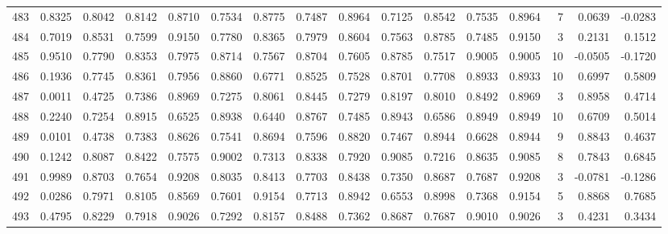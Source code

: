 \begin{tabular}{lrrrrrrrrrrrrrrr}
483 &      0.8325 &  0.8042 &  0.8142 &  0.8710 &  0.7534 &  0.8775 &  0.7487 &  0.8964 &  0.7125 &  0.8542 &   0.7535 &     0.8964 &      7 &                    0.0639 &                    -0.0283 \\
484 &      0.7019 &  0.8531 &  0.7599 &  0.9150 &  0.7780 &  0.8365 &  0.7979 &  0.8604 &  0.7563 &  0.8785 &   0.7485 &     0.9150 &      3 &                    0.2131 &                     0.1512 \\
485 &      0.9510 &  0.7790 &  0.8353 &  0.7975 &  0.8714 &  0.7567 &  0.8704 &  0.7605 &  0.8785 &  0.7517 &   0.9005 &     0.9005 &     10 &                   -0.0505 &                    -0.1720 \\
486 &      0.1936 &  0.7745 &  0.8361 &  0.7956 &  0.8860 &  0.6771 &  0.8525 &  0.7528 &  0.8701 &  0.7708 &   0.8933 &     0.8933 &     10 &                    0.6997 &                     0.5809 \\
487 &      0.0011 &  0.4725 &  0.7386 &  0.8969 &  0.7275 &  0.8061 &  0.8445 &  0.7279 &  0.8197 &  0.8010 &   0.8492 &     0.8969 &      3 &                    0.8958 &                     0.4714 \\
488 &      0.2240 &  0.7254 &  0.8915 &  0.6525 &  0.8938 &  0.6440 &  0.8767 &  0.7485 &  0.8943 &  0.6586 &   0.8949 &     0.8949 &     10 &                    0.6709 &                     0.5014 \\
489 &      0.0101 &  0.4738 &  0.7383 &  0.8626 &  0.7541 &  0.8694 &  0.7596 &  0.8820 &  0.7467 &  0.8944 &   0.6628 &     0.8944 &      9 &                    0.8843 &                     0.4637 \\
490 &      0.1242 &  0.8087 &  0.8422 &  0.7575 &  0.9002 &  0.7313 &  0.8338 &  0.7920 &  0.9085 &  0.7216 &   0.8635 &     0.9085 &      8 &                    0.7843 &                     0.6845 \\
491 &      0.9989 &  0.8703 &  0.7654 &  0.9208 &  0.8035 &  0.8413 &  0.7703 &  0.8438 &  0.7350 &  0.8687 &   0.7687 &     0.9208 &      3 &                   -0.0781 &                    -0.1286 \\
492 &      0.0286 &  0.7971 &  0.8105 &  0.8569 &  0.7601 &  0.9154 &  0.7713 &  0.8942 &  0.6553 &  0.8998 &   0.7368 &     0.9154 &      5 &                    0.8868 &                     0.7685 \\
493 &      0.4795 &  0.8229 &  0.7918 &  0.9026 &  0.7292 &  0.8157 &  0.8488 &  0.7362 &  0.8687 &  0.7687 &   0.9010 &     0.9026 &      3 &                    0.4231 &                     0.3434 \\

\end{tabular}
